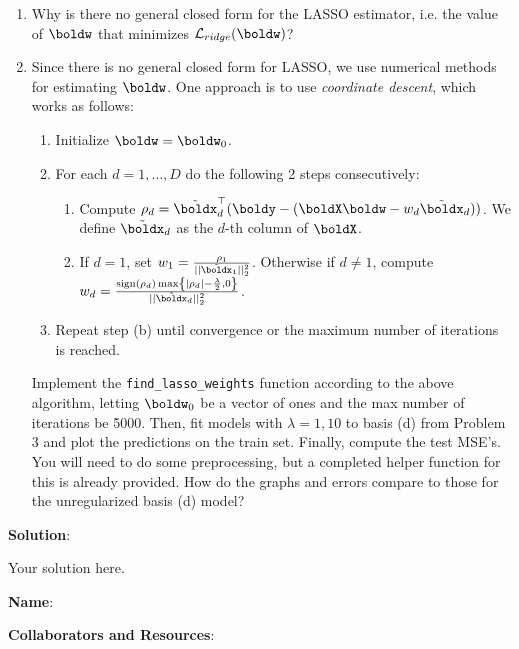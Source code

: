 \documentclass[submit]{../harvardml}
\newenvironment{solution}{
    \vspace{2mm}
    \color{blue}\noindent\textbf{Solution}:
}{}
\begin{document}
\begin{problem}
\begin{enumerate}
    \item Why is there no general closed form for the LASSO estimator, i.e. the value of $\boldw$ that minimizes $\mathcal{L}_{ridge}(\boldw)$?

    \item Since there is no general closed form for LASSO, we use numerical methods for estimating $\boldw$. One approach is to use \textit{coordinate descent}, which works as follows: 
    \begin{enumerate}
        \item Initialize $\boldw=\boldw_0$.
        \item For each $d=1, \ldots, D$ do the following 2 steps consecutively:
        \begin{enumerate}
            \item Compute $\rho_d = \tilde{\boldx}_d^\top(\boldy - (\boldX \boldw - w_d \tilde{\boldx}_d))$. We define $\tilde{\boldx}_d$ as the $d$-th column of $\boldX$.

            \item If $d=1$, set $w_1 = \frac{\rho_1}{||\tilde{\boldx}_1||^2_2}$. Otherwise if $d\ne 1$, compute $w_d = \frac{\text{sign}(\rho_d)\max\left\{|\rho_d|-\frac{\lambda}{2}, 0\right\}}{||\tilde{\boldx}_d||^2_2}$.
        \end{enumerate}
        \item Repeat step (b) until convergence or the maximum number of iterations is reached.
    \end{enumerate} 

    Implement the \texttt{find\_lasso\_weights} function according to the above algorithm, letting $\boldw_0$ be a vector of ones and the max number of iterations be 5000. Then, fit models with $\lambda=1, 10$ to basis (d) from Problem 3 and plot the predictions on the train set. Finally, compute the test MSE's. You will need to do some preprocessing, but a completed helper function for this is already provided. How do the graphs and errors compare to those for the unregularized basis (d) model? 


\end{enumerate}

\end{problem}

\newpage
\begin{solution}
	Your solution here.
\end{solution}

\newpage

\textbf{Name}:

\textbf{Collaborators and Resources}: 
\end{document}
